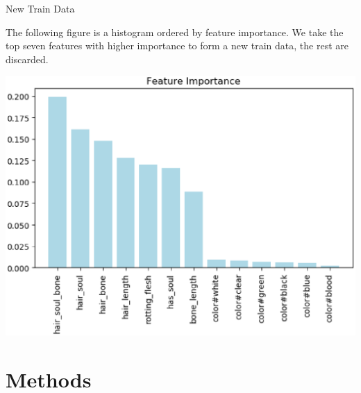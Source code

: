 \documentclass[
 size=14pt,
 paper=smartboard,  %
 mode=present, 		%
 display=slides, 	%
 style=tuliplab,  	%
 pauseslide,
 fleqn,leqno]{powerdot}
\begin{document}

\begin{slide}[toc=,bm=]{New Train Data}
	
	The following figure is 
	a histogram ordered by 
	feature importance. 
	We take the top seven features 
	with higher importance 
	to form a new train data, 
	the rest are discarded.
	\begin{center}
		\includegraphics[scale=0.5]{figures/FEATURE.eps}
	\end{center}
	
\end{slide}


\section{Methods}
\end{document}
